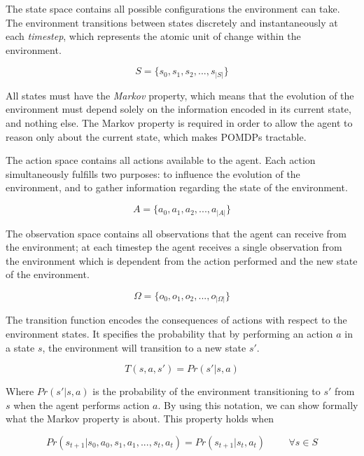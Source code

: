The state space contains all possible configurations the environment can take.  The environment
transitions between states discretely and instantaneously at each \textit{timestep}, which
represents the atomic unit of change within the environment.

\begin{equation}
 S = \{s_0, s_1, s_2, ..., s_{|S|}\}
\end{equation}

All states must have the \textit{Markov} property, which means that the evolution of the environment
must depend solely on the information encoded in its current state, and nothing else. The Markov
property is required in order to allow the agent to reason only about the current state, which makes
POMDPs tractable.

The action space contains all actions available to the agent. Each action simultaneously fulfills
two purposes: to influence the evolution of the environment, and to gather information regarding the
state of the environment.

\begin{equation}
 A = \{ a_0, a_1, a_2, ..., a_{|A|} \}
\end{equation}

The observation space contains all observations that the agent can receive from the environment; at
each timestep the agent receives a single observation from the environment which is dependent from
the action performed and the new state of the environment.

\begin{equation}
 \Omega = \{ o_0, o_1, o_2, ..., o_{|\Omega|} \}
\end{equation}

The transition function encodes the consequences of actions with respect to the environment states.
It specifies the probability that by performing an action $a$ in a state $s$, the
environment will transition to a new state $s'$.

\begin{equation}
 T(s, a, s') = Pr(s' | s, a)
\end{equation}

Where $Pr(s'|s,a)$ is the probability of the environment transitioning to $s'$ from $s$ when the
agent performs action $a$. By using this notation, we can show formally what the Markov property is
about. This property holds when

\begin{equation}
 Pr(s_{t+1} | s_{0}, a_{0}, s_{1}, a_{1}, ..., s_{t}, a_{t} ) = Pr(s_{t+1} | s_t, a_t ) \hspace{1cm} \forall s \in S
\end{equation}

